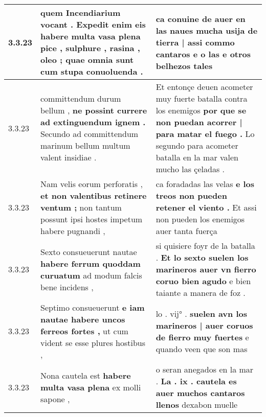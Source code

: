 \begin{tabular}{|p{1cm}|p{6.5cm}|p{6.5cm}|}
3.3.23 & quem Incendiarium vocant . \textbf{ Expedit enim eis habere multa vasa plena pice , sulphure , rasina , oleo ; } quae omnia sunt cum stupa conuoluenda . & ca conuine de auer en las naues \textbf{ mucha usija de tierra | assi commo cantaros e o las } e otros belhezos tales \\\hline
3.3.23 & committendum durum bellum , \textbf{ ne possint currere ad extinguendum ignem . } Secundo ad committendum marinum bellum multum valent insidiae . & Et entonçe deuen acometer muy fuerte batalla contra los enemigos \textbf{ por que se non puedan acorrer | para matar el fuego . } Lo segundo para acometer batalla en la mar valen mucho las çeladas . \\\hline
3.3.23 & Nam velis eorum perforatis , \textbf{ et non valentibus retinere ventum ; } non tantum possunt ipsi hostes impetum habere pugnandi , & ca foradadas las velas \textbf{ e los treos non pueden retener el viento . } Et assi non pueden los enemigos auer tanta fuerça \\\hline
3.3.23 & Sexto consueuerunt nautae \textbf{ habere ferrum quoddam curuatum } ad modum falcis bene incidens , & si quisiere foyr de la batalla . \textbf{ Et lo sexto suelen los marineros auer vn fierro coruo bien agudo } e bien taiante a manera de foz . \\\hline
3.3.23 & Septimo consueuerunt \textbf{ e iam nautae habere uncos ferreos fortes , } ut cum vident se esse plures hostibus , & lo . vij° . \textbf{ suelen avn los marineros | auer coruos de fierro muy fuertes } e quando veen que son mas \\\hline
3.3.23 & Nona cautela est \textbf{ habere multa vasa plena } ex molli sapone , & o seran anegados en la mar . \textbf{ La . ix . cautela es auer muchos cantaros llenos } dexabon muelle \\\hline

\end{tabular}
